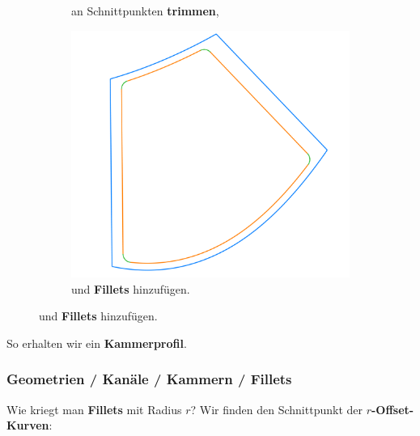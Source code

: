 \documentclass[8pt, aspectratio=169]{beamer}
\begin{document}
\begin{frame}
\begin{minipage}[t]{\textwidth}
\begin{figure}[H]
\begin{subfigure}{.32\textwidth}
				\caption{an Schnittpunkten \textbf{trimmen},}
			\end{subfigure}
			\begin{subfigure}{.32\textwidth}
				\includegraphics[width=\textwidth]{../../tec/chambers/83.png}
				\caption{und \textbf{Fillets} hinzufügen.}
			\end{subfigure}
			\label{fig:chamber_shrinking}
		\end{figure}
		So erhalten wir ein \textbf{Kammerprofil}.
	\end{minipage}
	\vfill
\end{frame}

\begin{frame}
	\frametitle{Geometrien / Kanäle / Kammern / Fillets}
	\vspace{-0.25cm}\hspace{-0.5cm}
	\centering
	\begin{minipage}[t]{\textwidth}
		Wie kriegt man \textbf{Fillets} mit Radius $r$? Wir finden den Schnittpunkt der \textbf{$r$-Offset-Kurven}:
		\begin{figure}[H]
			
		\end{figure}
		\begin{figure}[H]
			
		\end{figure}
	\end{minipage}
	\vfill
\end{frame}
\end{document}
